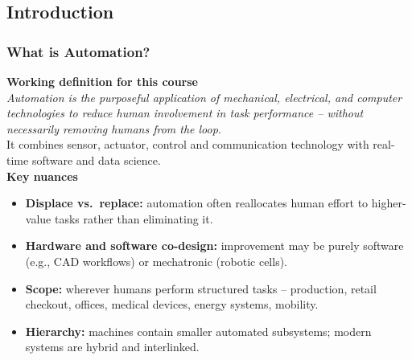 \subsection{Introduction}
\begin{frame}
	\frametitle{What is Automation?}
	\textbf{Working definition for this course}\\[1mm]
	\emph{Automation is the purposeful application of mechanical, electrical, and computer technologies to reduce human involvement in task performance -- without necessarily removing humans from the loop.}\\[1mm]
	It combines sensor, actuator, control and communication technology with real-time software and data science.\\[1mm]
	\textbf{Key nuances}
	\begin{itemize}
		\item \textbf{Displace vs.\ replace:} automation often reallocates human effort to higher-value tasks rather than eliminating it.
		\item \textbf{Hardware and software co-design:} improvement may be purely software (e.g., CAD workflows) or mechatronic (robotic cells).
		\item \textbf{Scope:} wherever humans perform structured tasks -- production, retail checkout, offices, medical devices, energy systems, mobility.
		\item \textbf{Hierarchy:} machines contain smaller automated subsystems; modern systems are hybrid and interlinked.
	\end{itemize}
\end{frame}
